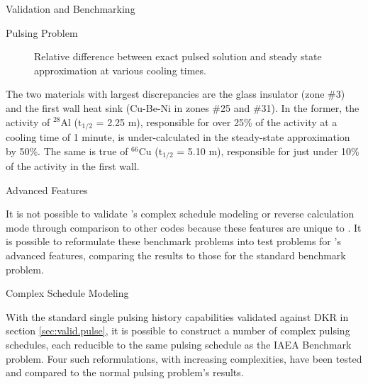 \begin{chapter}{Validation and Benchmarking\label{chap:valid}}
\begin{section}{Pulsing Problem\label{sec:valid.pulse}}
    \begin{figure}[htbp]
      \begin{center}
        \caption{Relative difference between exact pulsed solution and steady state approximation at various cooling times.}
        \label{fig:rel.diff.approx}
      \end{center}
    \end{figure}
    
    The two materials with largest discrepancies are the glass
    insulator (zone \#3) and the first wall heat sink (Cu-Be-Ni in
    zones \#25 and \#31).  In the former, the activity of $^{28}$Al
    (t$_{1/2}$ = 2.25 m), responsible for over 25\% of the activity at
    a cooling time of 1 minute, is under-calculated in the
    steady-state approximation by 50\%.  The same is true of $^{66}$Cu
    (t$_{1/2}$ = 5.10 m), responsible for just under 10\% of the
    activity in the first wall.
    
  \end{section}

  \begin{section}{Advanced Features}
  
    It is not possible to validate \ALARA's complex schedule modeling
    or reverse calculation mode through comparison to other codes
    because these features are unique to \ALARA.  It is possible to
    reformulate these benchmark problems into test problems for
    \ALARA's advanced features, comparing the results to those for the
    standard benchmark problem.

    \begin{subsection}{Complex Schedule Modeling}
    
      With the standard single pulsing history capabilities validated
      against DKR in section \ref{sec:valid.pulse}, it is possible to
      construct a number of complex pulsing schedules, each reducible
      to the same pulsing schedule as the IAEA Benchmark problem.
      Four such reformulations, with increasing complexities, have
      been tested and compared to the normal pulsing problem's
      results.
    

\end{subsection}
\end{section}
\end{chapter}
